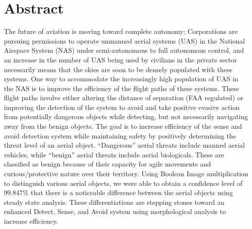 \section{Abstract}
The future of aviation is moving toward complete autonomy; Corporations are pursuing permissions to operate unmanned aerial systems (UAS) in the National Airspace System (NAS) under semi-autonomous to full autonomous control, and an increase in the number of UAS being used by civilians in the private sector necessarily means that the skies are soon to be densely populated with these systems. One way to accommodate the increasingly high population of UAS in the NAS is to improve the efficiency of the flight paths of these systems. These flight paths involve either altering the distance of separation (FAA regulated) or improving the detection of the system to avoid and take positive evasive action from potentially dangerous objects while detecting, but not necessarily navigating away from the benign objects. The goal is to increase efficiency of the sense and avoid detection system while maintaining safety by positively determining the threat level of an aerial object. “Dangerous” aerial threats include manned aerial vehicles, while “benign” aerial threats include aerial biologicals. These are classified as benign because of their capacity for agile movements and curious/protective nature over their territory. Using Boolean Image multiplication to distinguish various aerial objects, we were able to obtain a confidence level of 99.847\% that there is a noticeable difference between the aerial objects using steady state analysis. These differentiations are stepping stones toward an enhanced Detect, Sense, and Avoid system using morphological analysis to increase efficiency.   
